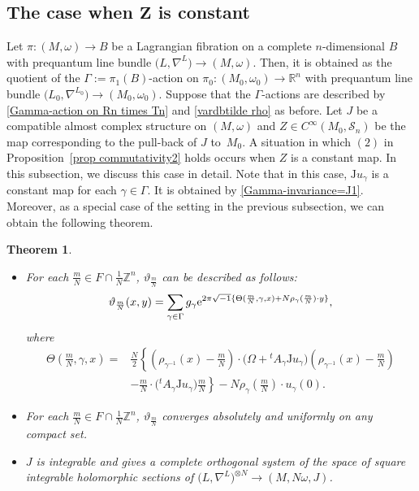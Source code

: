 \documentclass[pdftex]{sigma}
\numberwithin{equation}{section}
\newtheorem{Theorem}{Theorem}[section]
\newcommand{\R}{\mathbb{R}}
\newcommand{\Z}{\mathbb{Z}}
\def\J{\mathrm{J}}
\begin{document}
\subsection[The case when Z is constant]{The case when $\boldsymbol{Z}$ is constant}
Let $\pi\colon (M,\omega)\to B$ be a Lagrangian fibration on a complete $n$-dimensional $B$ with prequantum line bundle $\bigl(L,\nabla^L\bigr)\to (M,\omega)$. Then, it is obtained as the quotient of the $\Gamma:=\pi_1(B)$-action on $\pi_0\colon (M_0,\omega_0)\to \R^n$ with prequantum line bundle $\bigl({L_0}, \nabla^{L_0}\bigr)\to (M_0,\omega_0)$. Suppose that the $\Gamma$-actions are described by \eqref{Gamma-action on Rn times Tn} and \eqref{vardbtilde rho} as before. Let $J$ be a compatible almost complex structure on $(M,\omega)$ and $Z\in C^\infty (M_0, {\mathcal S}_n)$ be the map corresponding to the pull-back of $J$ to~$M_0$.
%
A situation in which $(2)$ in Proposition~\ref{prop commutativity2} holds occurs when $Z$ is a constant map. In this subsection, we discuss this case in detail. Note that in this case, $\J u_\gamma$ is a constant map for each $\gamma \in\Gamma$. It is obtained by \eqref{Gamma-invariance=J1}. Moreover, as a special case of the setting in the previous subsection, we can obtain the following theorem.
\begin{Theorem}\quad
\begin{itemize}\itemsep=0pt
\item[$(1)$] For each $\frac{m}{N}\in F\cap \frac{1}{N}\Z^n$, $\vartheta_{\frac{m}{N}}$ can be described as follows:
\begin{equation*}
\vartheta_{\frac{m}{N}}(x,y)=\sum_{\gamma \in \Gamma}g_\gamma {\rm e}^{2\pi\sqrt{-1}\{\Theta (\frac{m}{N}, \gamma, x)+N\rho_\gamma (\frac{m}{N})\cdot y\}},
\end{equation*}
where
\begin{align*}
\Theta \left(\frac{m}{N}, \gamma, x\right)={}&\frac{N}{2}\left\{\left(\rho_{\gamma^{-1}}(x)-\frac{m}{N}\right)\cdot \bigl(\Omega+{}^tA_\gamma \J u_\gamma\bigr)\left(\rho_{\gamma^{-1}}(x)-\frac{m}{N}\right)\right.\\
&\left.-\frac{m}{N}\cdot \bigl({}^tA_\gamma \J u_\gamma\bigr)\frac{m}{N}\right\}-N\rho_{\gamma}\left(\frac{m}{N}\right)\cdot u_\gamma (0) .
\end{align*}
\item[$(2)$] For each $\frac{m}{N}\in F\cap \frac{1}{N}\Z^n$, $\vartheta_{\frac{m}{N}}$ converges absolutely and uniformly on any compact set.
\item[$(3)$] $J$ is integrable and
\smash{$\{ \vartheta_{\frac{m}{N}}\}_{\frac{m}{N}\in F\cap \frac{1}{N}\Z^n}$} gives a complete orthogonal system of the space of square integrable holomorphic sections of $\bigl(L,\nabla^L\bigr)^{\otimes N}\to (M,N\omega, J)$.
\end{itemize}
\end{Theorem}
\end{document}
